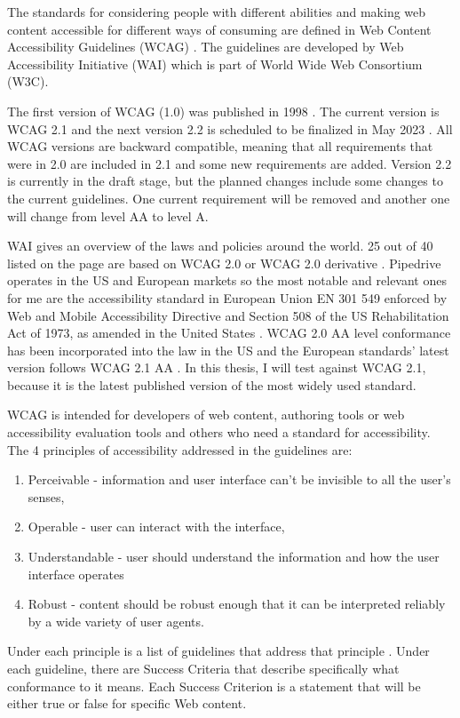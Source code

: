 \documentclass{master_thesis}
\begin{document}
The standards for considering people with different abilities and making web content accessible for different ways of consuming are defined in Web Content Accessibility Guidelines (WCAG) \citep{Kirkpatrick2018}. The guidelines are developed by Web Accessibility Initiative (WAI) which is part of World Wide Web Consortium (W3C).

The first version of WCAG (1.0) was published in 1998 \citep{Vanderheiden1998}. The current version is WCAG 2.1 and the next version 2.2 is scheduled to be finalized in May 2023 \citep{Henry2023}. All WCAG versions are backward compatible, meaning that all requirements that were in 2.0 are included in 2.1 and some new requirements are added. Version 2.2 is currently in the draft stage, but the planned changes include some changes to the current guidelines. One current requirement will be removed and another one will change from level AA to level A.

WAI gives an overview of the laws and policies around the world. 25 out of 40 listed on the page are based on WCAG 2.0 or WCAG 2.0 derivative \citep{Mueller2018}. Pipedrive operates in the US and European markets so the most notable and relevant ones for me are the accessibility standard in European Union EN 301 549 enforced by Web and Mobile Accessibility Directive \citep{MuellerEU2017} and Section 508 of the US Rehabilitation Act of 1973, as amended in the United States \citep{MuellerUS2017}. WCAG 2.0 AA level conformance has been incorporated into the law in the US and the European standards' latest version follows WCAG 2.1 AA \citep{LevelAccess2021}. In this thesis, I will test against WCAG 2.1, because it is the latest published version of the most widely used standard.


WCAG is intended for developers of web content, authoring tools or web accessibility evaluation tools and others who need a standard for accessibility. The 4 principles of accessibility addressed in the guidelines are:
\begin{enumerate}
	\item Perceivable - information and user interface can't be invisible to all the user's senses,
	\item Operable - user can interact with the interface,
	\item Understandable - user should understand the information and how the user interface operates
	\item Robust - content should be robust enough that it can be interpreted reliably by a wide variety of user agents.
\end{enumerate}
Under each principle is a list of guidelines that address that principle \citep{AGWGWP2022}. Under each guideline, there are Success Criteria that describe specifically what conformance to it means. Each Success Criterion is a statement that will be either true or false for specific Web content.
\end{document}
